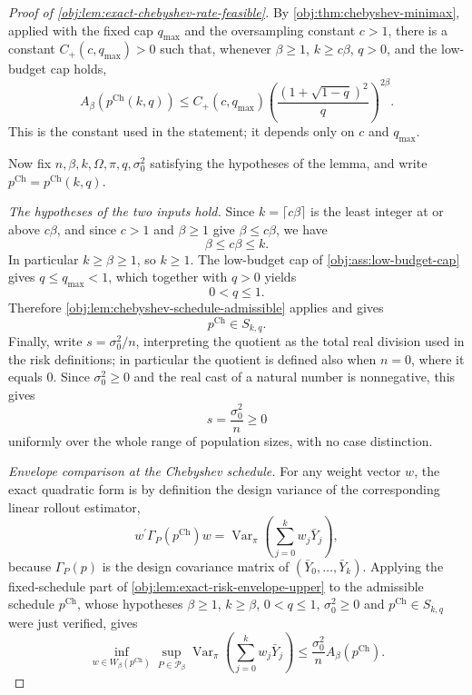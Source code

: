 \documentclass[11pt]{article}
\begin{document}
\begin{proof}[Proof of \cref{obj:lem:exact-chebyshev-rate-feasible}]
By \cref{obj:thm:chebyshev-minimax}, applied with the fixed cap \(q_{\max}\) and the oversampling constant \(c>1\), there is a constant \(C_+(c,q_{\max})>0\) such that, whenever \(\beta\ge1\), \(k\ge c\beta\), \(q>0\), and the low-budget cap holds,
\[
A_\beta\!\left(p^{\mathrm{Ch}}(k,q)\right)
\le
C_+(c,q_{\max})
\left(\frac{(1+\sqrt{1-q})^2}{q}\right)^{2\beta}.
\]
This is the constant used in the statement; it depends only on \(c\) and \(q_{\max}\).

Now fix \(n,\beta,k,\Omega,\pi,q,\sigma_0^2\) satisfying the hypotheses of the lemma, and write \(p^{\mathrm{Ch}}=p^{\mathrm{Ch}}(k,q)\).

\emph{The hypotheses of the two inputs hold.}
Since \(k=\lceil c\beta\rceil\) is the least integer at or above \(c\beta\), and since \(c>1\) and \(\beta\ge1\) give \(\beta\le c\beta\), we have
\[
\beta\le c\beta\le k .
\] %
In particular \(k\ge\beta\ge1\), so \(k\ge1\). The low-budget cap of \cref{obj:ass:low-budget-cap} gives \(q\le q_{\max}<1\), which together with \(q>0\) yields
\[
0<q\le1 .
\] %
Therefore \cref{obj:lem:chebyshev-schedule-admissible} applies and gives
\[
p^{\mathrm{Ch}}\in S_{k,q}.
\]
Finally, write \(s=\sigma_0^2/n\), interpreting the quotient as the total real division used in the risk definitions; in particular the quotient is defined also when \(n=0\), where it equals \(0\). Since \(\sigma_0^2\ge0\) and the real cast of a natural number is nonnegative, this gives
\[
s=\frac{\sigma_0^2}{n}\ge0
\]
uniformly over the whole range of population sizes, with no case distinction. %

\emph{Envelope comparison at the Chebyshev schedule.}
For any weight vector \(w\), the exact quadratic form is by definition the design variance of the corresponding linear rollout estimator,
\[
w^\prime\Gamma_P\!\left(p^{\mathrm{Ch}}\right)w
=
\operatorname{Var}_\pi\!\left(\sum_{j=0}^k w_j\bar Y_j\right),
\]
because \(\Gamma_P(p)\) is the design covariance matrix of \((\bar Y_0,\ldots,\bar Y_k)\). Applying the fixed-schedule part of \cref{obj:lem:exact-risk-envelope-upper} to the admissible schedule \(p^{\mathrm{Ch}}\), whose hypotheses \(\beta\ge1\), \(k\ge\beta\), \(0<q\le1\), \(\sigma_0^2\ge0\) and \(p^{\mathrm{Ch}}\in S_{k,q}\) were just verified, gives
\[
\inf_{w\in W_\beta(p^{\mathrm{Ch}})}
\sup_{P\in\mathcal P_\beta}
\operatorname{Var}_\pi\!\left(\sum_{j=0}^k w_j\bar Y_j\right)
\le
\frac{\sigma_0^2}{n}
A_\beta\!\left(p^{\mathrm{Ch}}\right).
\]


\end{proof}
\end{document}
